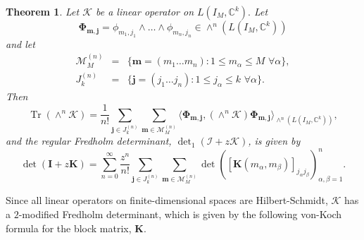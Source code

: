 \documentclass{birkjour}
\newtheorem{thm}{Theorem}[section]
\theoremstyle{definition}
\theoremstyle{remark}
\numberwithin{equation}{section}
\begin{document}
   
\begin{thm}\label{det1IM}
Let $\mathcal{K}$ be a linear operator on $L(I_M, \mathbb{C}^k).$  Let
\begin{equation}
    \boldsymbol{\Phi}_{\mathbf{m}, \mathbf{j}} = \phi_{m_1, j_1} \wedge \dots \wedge \phi_{m_n, j_n} \in \wedge^n(L(I_M, \mathbb{C}^k))
\end{equation}
and let
\begin{eqnarray}
\mathcal{M}_M^{(n)} &=& \{\mathbf{m} = (m_1 \dots m_n) : 1 \leq m_{\alpha} \leq M \,\, \forall \alpha\},\\
J_k^{(n)} &=& \{\mathbf{j} = (j_1 \dots j_n) : 1 \leq j_{\alpha} \leq k \,\, \forall \alpha\}.
\end{eqnarray}
Then 
  \begin{equation}\label{discretetrace}
        \operatorname{Tr}(\wedge^n \mathcal{K}) = \frac{1}{n!}  \sum_{\mathbf{j} \in J_k^{(n)}}  \sum_{\mathbf{m} \in \mathcal{M}_M^{(n)}} 
 \langle \boldsymbol{\Phi}_{\mathbf{m}, \mathbf{j}}, (\wedge^n \mathcal{K}) \boldsymbol{\Phi}_{\mathbf{m}, \mathbf{j}} \rangle_{\wedge^n(L(I_M, \mathbb{C}^k))},
    \end{equation}
     and the regular Fredholm determinant,  ${\det}_1(\mathcal{I} + z \mathcal{K})$,  is given by
     \begin{equation}\label{discdet} 
          \det(\mathbf{I} + z \mathbf{K}) 
         = \sum_{n=0}^{\infty} \frac{z^n}{n!}  \sum_{\mathbf{j} \in J^{(n)}_k} \sum_{\mathbf{m} \in \mathcal{M}_M^{(n)}} \det\left( [\mathbf{K}(m_{\alpha}, m_{\beta})]_{j_{\alpha} j_{\beta}} \right)_{\alpha, \beta = 1}^n.
 \end{equation}
\end{thm}


Since all linear operators on finite-dimensional spaces are Hilbert-Schmidt, $\mathcal{K}$ has a $2$-modified Fredholm determinant, which is given by the following von-Koch formula for 
the block matrix, $\mathbf K$.  
 
\end{document}
